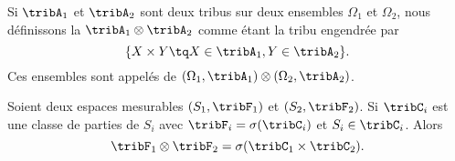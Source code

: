\begin{definition}      \label{DefTribProfGfYTuR}
    Si \( \tribA_1\) et \( \tribA_2\) sont deux tribus sur deux ensembles \( \Omega_1\) et \( \Omega_2\), nous définissons la  \( \tribA_1\otimes\tribA_2\) comme étant la tribu engendrée par 
    \begin{equation}
        \{ X\times Y\tq X\in\tribA_1,Y\in\tribA_2 \}.
    \end{equation}
    Ces ensembles sont appelés  de \( (\Omega_1,\tribA_1)\otimes (\Omega_2,\tribA_2)\).
\end{definition}

\begin{proposition}        \label{PropLJJWooKqWlTr}
    Soient deux espaces mesurables \( (S_1,\tribF_1)\) et \( (S_2,\tribF_2)\). Si \( \tribC_i\) est une classe de parties de \( S_i\) avec \( \tribF_i=\sigma(\tribC_i)\) et \( S_i\in\tribC_i\). Alors 
    \begin{equation}
        \tribF_1\otimes \tribF_2=\sigma(\tribC_1\times \tribC_2).
    \end{equation}
\end{proposition}

